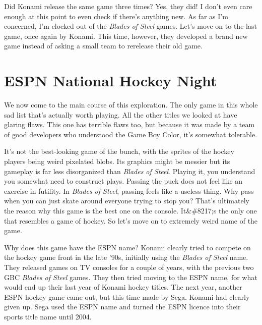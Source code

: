 \documentclass{book}
\let\oldcenter\center
\let\oldendcenter\endcenter
\renewenvironment{center}{\setlength\topsep{0pt}\oldcenter}{\oldendcenter}
\begin{document}
Did Konami release the same game three times? Yes, they did! I don’t even care enough at this point to even check if there’s anything new. As far as I’m concerned, I’m clocked out of the \emph{Blades of Steel} games. Let’s move on to the last game, once again by Konami. This time, however, they developed a brand new game instead of asking a small team to rerelease their old game.

\FloatBarrier\needspace{10mm}\section*{ESPN National Hockey Night}\nopagebreak[4]

\begin{center}
\vspace{8pt}
\quad\vspace{4pt}
\quad\vspace{4pt}
\quad\vspace{4pt}
\end{center}

We now come to the main course of this exploration. The only game in this whole sad list that’s actually worth playing. All the other titles we looked at have glaring flaws. This one has terrible flaws too, but because it was made by a team of good developers who understood the Game Boy Color, it’s somewhat tolerable.

It’s not the best-looking game of the bunch, with the sprites of the hockey players being weird pixelated blobs. Its graphics might be messier but its gameplay is far less disorganized than \emph{Blades of Steel}. Playing it, you understand you somewhat need to construct plays. Passing the puck does not feel like an exercise in futility. In \emph{Blades of Steel}, passing feels like a useless thing. Why pass when you can just skate around everyone trying to stop you? That’s ultimately the reason why this game is the best one on the console. It&\#8217;s the only one that resembles a game of hockey. So let’s move on to extremely weird name of the game.

Why does this game have the ESPN name? Konami clearly tried to compete on the hockey game front in the late ’90s, initially using the \emph{Blades of Steel} name. They released games on TV consoles for a couple of years, with the previous two GBC \emph{Blades of Steel} games. They then tried moving to the ESPN name, for what would end up their last year of Konami hockey titles. The next year, another ESPN hockey game came out, but this time made by Sega. Konami had clearly given up. Sega used the ESPN name and turned the ESPN licence into their sports title name until 2004.
\end{document}
